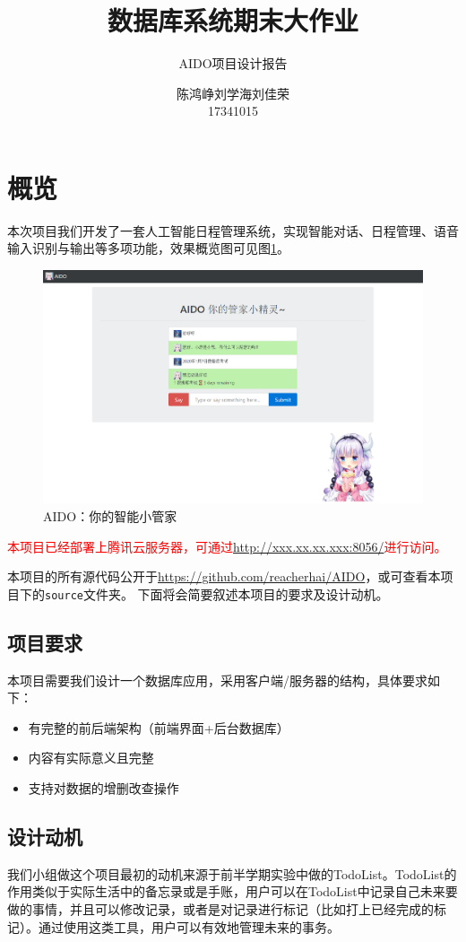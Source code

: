 \documentclass[logo,reportComp]{thesis}
\title{数据库系统期末大作业}
\subtitle{AIDO项目设计报告}
\author{陈鸿峥\qquad 刘学海\qquad 刘佳荣\\17341015\qquad 17341111\qquad 17341109}
\begin{document}
\maketitle

\section{概览}
本次项目我们开发了一套人工智能日程管理系统，实现智能对话、日程管理、语音输入识别与输出等多项功能，效果概览图可见图\ref{fig:overview}。
\begin{figure}[H]
\centering
\includegraphics[width=\linewidth]{fig/overview.png}
\caption{AIDO：你的智能小管家}
\label{fig:overview}
\end{figure}

\textcolor{red}{本项目已经部署上腾讯云服务器，可通过\url{http://xxx.xx.xx.xxx:8056/}进行访问。}

本项目的所有源代码公开于\url{https://github.com/reacherhai/AIDO}，或可查看本项目下的\verb'source'文件夹。
下面将会简要叙述本项目的要求及设计动机。

\subsection{项目要求}
本项目需要我们设计一个数据库应用，采用客户端/服务器的结构，具体要求如下：
\begin{itemize}
\item 有完整的前后端架构（前端界面+后台数据库）
\item 内容有实际意义且完整
\item 支持对数据的增删改查操作
\end{itemize}

\subsection{设计动机}
我们小组做这个项目最初的动机来源于前半学期实验中做的TodoList。TodoList的作用类似于实际生活中的备忘录或是手账，用户可以在TodoList中记录自己未来要做的事情，并且可以修改记录，或者是对记录进行标记（比如打上已经完成的标记）。通过使用这类工具，用户可以有效地管理未来的事务。
\end{document}
